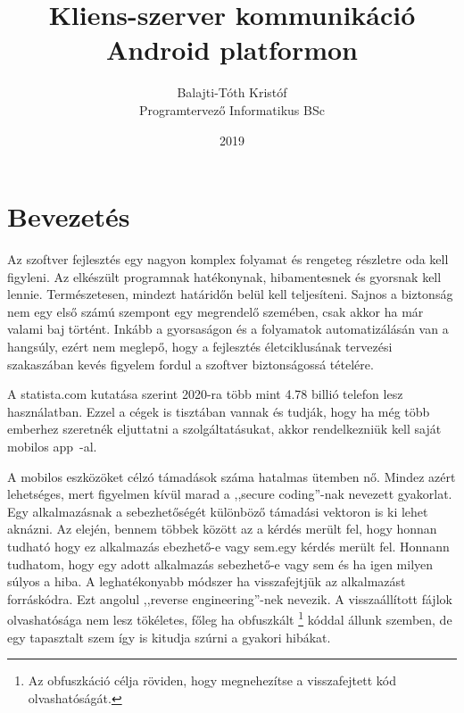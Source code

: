 \documentclass{thesis-ekf}
\theoremstyle{definition}
\theoremstyle{remark}
\begin{document}
\title{Kliens-szerver kommunikáció\\Android platformon}
\author{Balajti-Tóth Kristóf\\Programtervező Informatikus BSc}
\date{2019}
\maketitle
\tableofcontents

\chapter*{Bevezetés}
Az szoftver fejlesztés egy nagyon komplex folyamat és rengeteg részletre oda kell figyleni.
Az elkészült programnak hatékonynak, hibamentesnek és gyorsnak kell lennie. Természetesen, mindezt határidőn belül kell teljesíteni.
Sajnos a biztonság nem egy első számú szempont egy megrendelő szemében, csak akkor ha már valami baj történt.
Inkább a gyorsaságon és a folyamatok automatizálásán van a hangsúly, ezért nem  meglepő, hogy a fejlesztés életciklusának tervezési szakaszában kevés figyelem fordul a szoftver biztonságossá tételére.

A statista.com \cite{statista} kutatása szerint 2020-ra több mint 4.78 billió telefon lesz használatban.
Ezzel a cégek is tisztában vannak és tudják, hogy ha még több emberhez szeretnék eljuttatni a szolgáltatásukat, akkor rendelkezniük kell saját mobilos app~-al.

A mobilos eszközöket célzó támadások száma hatalmas ütemben nő. Mindez azért lehetséges, mert figyelmen kívül marad a ,,secure coding''-nak nevezett gyakorlat.
Egy alkalmazásnak a sebezhetőségét különböző támadási vektoron is ki lehet aknázni.
Az elején, bennem többek között az a kérdés merült fel, hogy honnan tudható hogy ez alkalmazás ebezhető-e vagy sem.egy kérdés merült fel.
Honnann tudhatom, hogy egy adott alkalmazás sebezhető-e vagy sem és ha igen milyen súlyos a hiba.
A leghatékonyabb módszer ha visszafejtjük az alkalmazást forráskódra.
Ezt angolul ,,reverse engineering''-nek nevezik.
A visszaállított fájlok olvashatósága nem lesz tökéletes, főleg ha obfuszkált \footnote{Az obfuszkáció célja röviden, hogy megnehezítse a visszafejtett kód olvashatóságát.} kóddal állunk szemben, de egy tapasztalt szem így is kitudja szúrni a gyakori hibákat.
\end{document}
